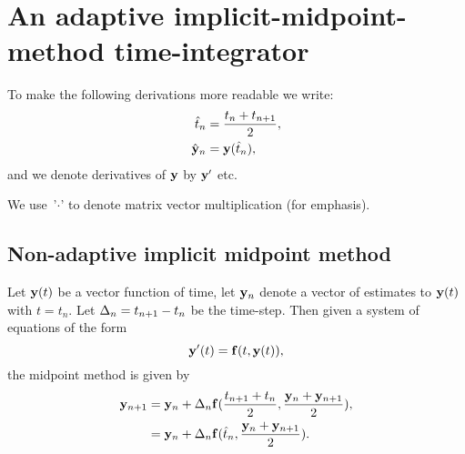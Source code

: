 

\newcommand{\valueatmidpoint}[1]{\hat{#1}}

\newcommand{\thfx}[1]{\valueatmidpoint{t}_{#1}}
\newcommand{\thf}{\thfx{n}}

\newcommand{\yvhfx}[1]{\valueatmidpoint{\yv}_{#1}}
\newcommand{\yvhf}{\yvhfx{n}}


\newcommand{\dfdy}{F}
\newcommand{\dfdyhfx}[1]{\valueatmidpoint{\dfdy_{#1}}}
\newcommand{\dfdyhf}{\dfdyhfx{n}}



\section{An adaptive implicit-midpoint-method time-integrator}









To make the following derivations more readable we write:
\begin{align}
  \thf &= \frac{t_n + t_{n+1}}{2}, \notag\\
  \yvhf &= \yv(\thf), %
\end{align}
and we denote derivatives of $\mathbf{y}$ by $\mathbf{y}'$ etc.

We use~'$\cdot$' to denote matrix vector multiplication (for emphasis).



\subsection{Non-adaptive implicit midpoint method}

Let $\mathbf{y}(t)$ be a vector function of time, let $\mathbf{y}_n$ denote a vector of estimates to $\mathbf{y}(t)$ with $t = t_n$.
Let $\Delta_{n} = t_{n+1} - t_n$ be the time-step.
Then given a system of equations of the form
\begin{equation}
  \mathbf{y}'(t) = {\mathbf{f}}(t, \mathbf{y}(t)),
  \label{eq:43}
\end{equation}
the midpoint method is given by
\begin{align}
  \yv_{n+1} &= \yv_n + \dtn \fv(\frac{t_{n+1} + t_n}{2}, \frac{\yv_n + \yv_{n+1}}{2}), \notag\\
  &= \yv_n + \dtn \fv(\thf, \frac{\yv_n + \yv_{n+1}}{2}).
  \label{eq:basic-midpoint}
\end{align}

